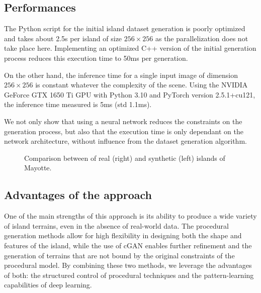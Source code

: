 \subsection{Performances}

The Python script for the initial island dataset generation is poorly optimized and takes about 2.5s per island of size $256 \times 256$ as the parallelization does not take place here. Implementing an optimized C++ version of the initial generation process reduces this execution time to 50ms per generation.

On the other hand, the inference time for a single input image of dimension $256 \times 256$ is constant whatever the complexity of the scene. Using the NVIDIA GeForce GTX 1650 Ti GPU with Python 3.10 and PyTorch version 2.5.1+cu121, the inference time measured is 5ms (std 1.1ms). 

We not only show that using a neural network reduces the constraints on the generation process, but also that the execution time is only dependant on the network architecture, without influence from the dataset generation algorithm. 


\begin{figure}
    \caption{Comparison between of real (right) and synthetic (left) islands of Mayotte.}
\end{figure}


\subsection{Advantages of the approach}

One of the main strengths of this approach is its ability to produce a wide variety of island terrains, even in the absence of real-world data. The procedural generation methods allow for high flexibility in designing both the shape and features of the island, while the use of cGAN enables further refinement and the generation of terrains that are not bound by the original constraints of the procedural model. By combining these two methods, we leverage the advantages of both: the structured control of procedural techniques and the pattern-learning capabilities of deep learning.

